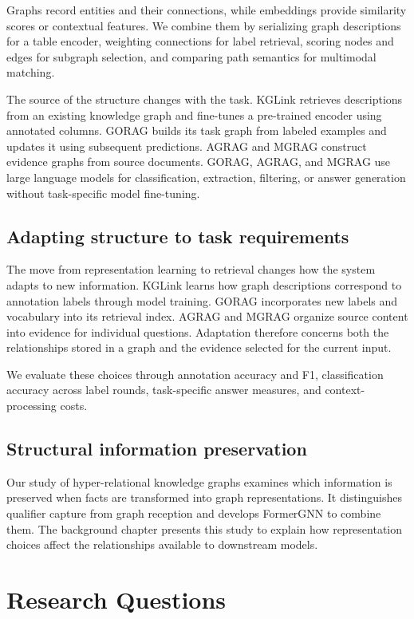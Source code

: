 Graphs record entities and their connections, while embeddings provide similarity scores or contextual features. We combine them by serializing graph descriptions for a table encoder, weighting connections for label retrieval, scoring nodes and edges for subgraph selection, and comparing path semantics for multimodal matching.

The source of the structure changes with the task. KGLink retrieves descriptions from an existing knowledge graph and fine-tunes a pre-trained encoder using annotated columns. GORAG builds its task graph from labeled examples and updates it using subsequent predictions. AGRAG and MGRAG construct evidence graphs from source documents. GORAG, AGRAG, and MGRAG use large language models for classification, extraction, filtering, or answer generation without task-specific model fine-tuning.

\subsection{Adapting structure to task requirements}

The move from representation learning to retrieval changes how the system adapts to new information. KGLink learns how graph descriptions correspond to annotation labels through model training. GORAG incorporates new labels and vocabulary into its retrieval index. AGRAG and MGRAG organize source content into evidence for individual questions. Adaptation therefore concerns both the relationships stored in a graph and the evidence selected for the current input.

We evaluate these choices through annotation accuracy and F1, classification accuracy across label rounds, task-specific answer measures, and context-processing costs.

\subsection{Structural information preservation}
Our study of hyper-relational knowledge graphs examines which information is preserved when facts are transformed into graph representations. It distinguishes qualifier capture from graph reception and develops FormerGNN to combine them. The background chapter presents this study to explain how representation choices affect the relationships available to downstream models.

\section{Research Questions}
\label{sec:introduction:questions}
